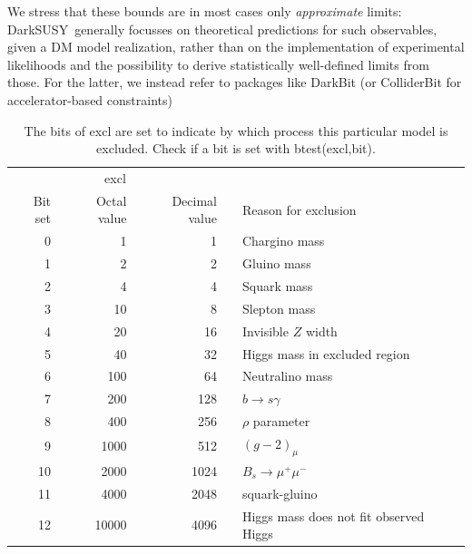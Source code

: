 \documentclass[a4paper,10pt,oneside]{book}
\newcommand{\code}[1]{\ft{#1}}
\newcommand{\ds}{{\sffamily DarkSUSY}}
\newcommand{\ft}[1]{\textsf{#1}}
\begin{document}
We stress that these bounds are in most cases only {\it approximate} limits: \ds\ generally 
focusses on theoretical predictions for such observables, given a DM model realization,
rather than on the implementation of experimental likelihoods and the possibility to derive
statistically well-defined limits from those. For the latter, we instead refer to packages like 
{\sf DarkBit} \cite{Workgroup:2017lvb} (or  {\sf ColliderBit} \cite{Balazs:2017moi} for 
accelerator-based constraints)

\begin{table}[!h]
\centering
\begin{tabular}{rrrcl} \hline
\multicolumn{3}{c}{\code{excl}} && \\ \cline{1-3}
Bit set & Octal value & Decimal value && Reason for exclusion \\ \hline
 0 &             1 &            1 && Chargino mass \\
 1 &             2 &            2 && Gluino mass \\
 2 &             4 &            4 && Squark mass \\
 3 &            10 &            8 && Slepton mass \\
 4 &            20 &           16 && Invisible $Z$ width \\
 5 &            40 &           32 && Higgs mass in excluded region \\
 6 &           100 &           64 && Neutralino mass \\
 7 &           200 &          128 && $b \rightarrow s \gamma$ \\
 8 &           400 &          256 && $\rho$ parameter \\ 
 9 &		 1000 &	512 &&  $(g-2)_\mu$ \\  
10 &		 2000  &	1024 && $B_s \to \mu^+ \mu^-$ \\
11  &		4000   & 	2048 && squark-gluino\\
12  &		10000  &  4096 &&  Higgs mass does not fit observed Higgs  \\  
 \hline
\end{tabular}
\caption{The bits of \code{excl} are set to indicate by which process this
particular model is excluded. Check if a bit is set with 
\code{btest(excl,bit)}.}
\label{tab:acexcl}
\end{table}
\end{document}
